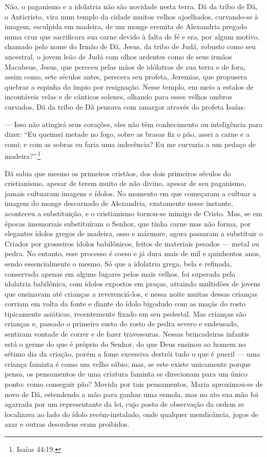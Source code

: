 Não, o paganismo e a idolatria não são novidade nesta terra. Dã da tribo
de Dã, o Anticristo, vira num templo da cidade muitos velhos ajoelhados,
curvando-se à imagem, esculpida em madeira, de um monge eremita de
Alexandria pregado numa cruz que sacrificara sua carne devido à falta de
fé e era, por algum motivo, chamado pelo nome do Irmão de Dã, Jesus, da
tribo de Judá, robusto como seu ancestral, o jovem leão de Judá com
olhos ardentes como de seus irmãos Macabeus, Jesus, que pereceu pelas
mãos de idólatras de sua terra e de fora, assim como, sete séculos
antes, perecera seu profeta, Jeremias, que propusera quebrar a espinha
do ímpio por resignação. Nesse templo, em meio a estalos de incontáveis
velas e de cânticos solenes, olhando para esses velhos ombros curvados,
Dã da tribo de Dã pensava com amargor através do profeta Isaías:

--- Isso não atingirá seus corações, eles não têm conhecimento ou
inteligência para dizer: ``Eu queimei metade no fogo, sobre as brasas
fiz o pão, assei a carne e a comi; e com as sobras eu faria uma
indecência? Eu me curvaria a um pedaço de madeira?''.\footnote{Isaías
  44:19.}

Dã sabia que mesmo os primeiros cristãos, dos dois primeiros séculos do
cristianismo, apesar de terem muito de não divino, apesar de seu
paganismo, jamais cultuaram imagens e ídolos. No momento em que
começaram a cultuar a imagem do monge descarnado de Alexandria,
exatamente nesse instante, aconteceu a substituição, e o cristianismo
tornou-se inimigo de Cristo. Mas, se em épocas imemoriais substituíram o
Senhor, que tinha carne mas não forma, por elegantes ídolos gregos de
madeira, osso e mármore, agora passaram a substituir o Criador por
grosseiros ídolos babilônicos, feitos de materiais pesados --- metal ou
pedra. No entanto, esse processo é coeso e já dura mais de mil e
quinhentos anos, sendo essencialmente o mesmo. Só que a idolatria grega,
bela e refinada, conservada apenas em alguns lugares pelos mais velhos,
foi superada pela idolatria babilônica, com ídolos expostos em praças,
atraindo multidões de jovens que ensinavam até crianças a
reverenciá-los, e nessa noite muitas dessas crianças corriam em volta da
fonte e diante do ídolo bigodudo com as maçãs do rosto tipicamente
asiáticas, recentemente fixado em seu pedestal. Mas crianças são
crianças e, passado o primeiro susto do rosto de pedra severo e
endeusado, sentiram vontade de correr e de fazer travessuras. Nessas
brincadeiras infantis está o germe do que é próprio do Senhor, do que
Deus ensinou ao homem no sétimo dia da criação, porém a fome excessiva
destrói tudo o que é pueril --- uma criança faminta é como um velho
sábio; mas, se este existe unicamente porque pensa, os pensamentos de
uma criatura faminta se direcionam para um único ponto: como conseguir
pão? Movida por tais pensamentos, Maria aproximou-se de novo de Dã,
estendendo a mão para ganhar uma esmola, mas no ato sua mão foi agarrada
por um representante da lei, cujo posto de observação da ordem se
localizava ao lado do ídolo recém-instalado, onde qualquer mendicância,
jogos de azar e outras desordens eram proibidos.

